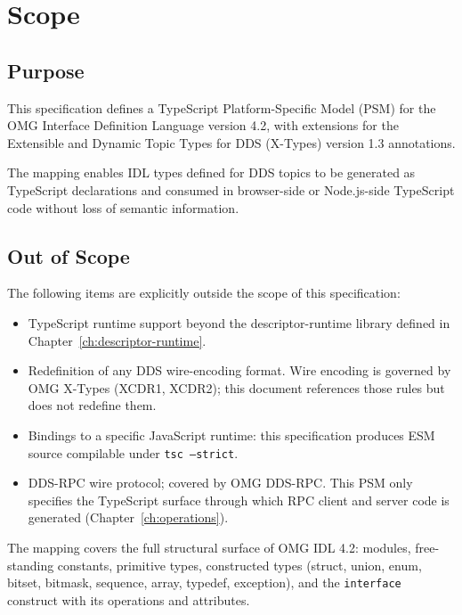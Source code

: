 \documentclass{../styles/zerodds-vendor-spec}
\begin{document}
\chapter{Scope}

\section{Purpose}

This specification defines a TypeScript Platform-Specific Model
(PSM) for the OMG Interface Definition Language version 4.2, with
extensions for the Extensible and Dynamic Topic Types for DDS
(X-Types) version 1.3 annotations.

The mapping enables IDL types defined for DDS topics to be
generated as TypeScript declarations and consumed in browser-side
or Node.js-side TypeScript code without loss of semantic
information.

\section{Out of Scope}

The following items are explicitly outside the scope of this
specification:

\begin{itemize}
  \item TypeScript runtime support beyond the descriptor-runtime
        library defined in Chapter~\ref{ch:descriptor-runtime}.
  \item Redefinition of any DDS wire-encoding format. Wire
        encoding is governed by OMG X-Types (XCDR1, XCDR2); this
        document references those rules but does not redefine
        them.
  \item Bindings to a specific JavaScript runtime: this
        specification produces ESM source compilable under
        \texttt{tsc --strict}.
  \item DDS-RPC wire protocol; covered by OMG DDS-RPC. This PSM
        only specifies the TypeScript surface through which RPC
        client and server code is generated
        (Chapter~\ref{ch:operations}).
\end{itemize}

The mapping covers the full structural surface of OMG IDL 4.2:
modules, free-standing constants, primitive types, constructed
types (struct, union, enum, bitset, bitmask, sequence, array,
typedef, exception), and the \texttt{interface} construct with
its operations and attributes.
\end{document}
